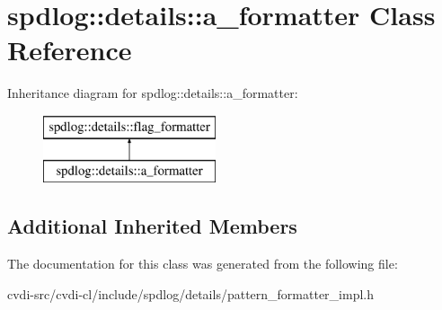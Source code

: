 \hypertarget{classspdlog_1_1details_1_1a__formatter}{}\section{spdlog\+:\+:details\+:\+:a\+\_\+formatter Class Reference}
\label{classspdlog_1_1details_1_1a__formatter}
Inheritance diagram for spdlog\+:\+:details\+:\+:a\+\_\+formatter\+:\begin{figure}[H]
\begin{center}
\leavevmode
\includegraphics[height=2.000000cm]{classspdlog_1_1details_1_1a__formatter}
\end{center}
\end{figure}
\subsection*{Additional Inherited Members}


The documentation for this class was generated from the following file\+:\begin{DoxyCompactItemize}
\item 
cvdi-\/src/cvdi-\/cl/include/spdlog/details/pattern\+\_\+formatter\+\_\+impl.\+h\end{DoxyCompactItemize}
